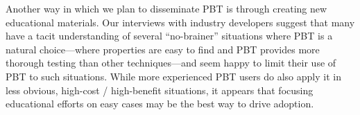 

%
Another way in which we plan to disseminate PBT is through creating new
educational materials.
Our interviews with industry developers suggest that many
have a tacit
understanding of several ``no-brainer'' situations where PBT is a natural
choice---where properties are easy to find and PBT provides
more thorough testing than other techniques---and
seem happy to limit their use of PBT to such situations.
While more experienced PBT users do also apply it in less obvious,
high-cost / high-benefit situations, it appears that
focusing educational efforts on easy cases may be the best way to
drive adoption.

